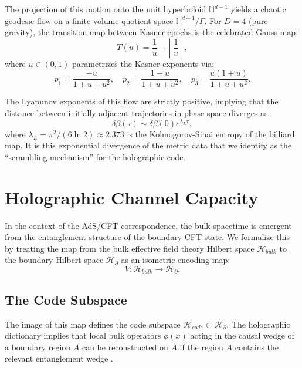 \documentclass[aps,prd,reprint,nofootinbib,amsmath,amssymb,amsfonts]{revtex4-2}
\begin{document}
The projection of this motion onto the unit hyperboloid $\mathbb{H}^{d-1}$ yields a chaotic geodesic flow on a finite volume quotient space $\mathbb{H}^{d-1} / \Gamma$. For $D=4$ (pure gravity), the transition map between Kasner epochs is the celebrated Gauss map:
\begin{equation}
    T(u) = \frac{1}{u} - \left\lfloor \frac{1}{u} \right\rfloor,
    \label{eq:gauss_map}
\end{equation}
where $u \in (0,1)$ parametrizes the Kasner exponents via:
\begin{equation}
    p_1 = \frac{-u}{1+u+u^2}, \quad p_2 = \frac{1+u}{1+u+u^2}, \quad p_3 = \frac{u(1+u)}{1+u+u^2}.
\end{equation}

The Lyapunov exponents of this flow are strictly positive, implying that the distance between initially adjacent trajectories in phase space diverges as:
\begin{equation}
    \delta \beta(\tau) \sim \delta \beta(0) e^{\lambda_L \tau},
\end{equation}
where $\lambda_L = \pi^2/(6\ln 2) \approx 2.373$ is the Kolmogorov-Sinai entropy of the billiard map. It is this exponential divergence of the metric data that we identify as the ``scrambling mechanism'' for the holographic code.

\section{Holographic Channel Capacity}
\label{sec:holo}

In the context of the AdS/CFT correspondence, the bulk spacetime is emergent from the entanglement structure of the boundary CFT state. We formalize this by treating the map from the bulk effective field theory Hilbert space $\mathcal{H}_{bulk}$ to the boundary Hilbert space $\mathcal{H}_{\partial}$ as an isometric encoding map:
\begin{equation}
    V: \mathcal{H}_{bulk} \to \mathcal{H}_{\partial}.
\end{equation}

\subsection{The Code Subspace}

The image of this map defines the code subspace $\mathcal{H}_{code} \subset \mathcal{H}_{\partial}$. The holographic dictionary implies that local bulk operators $\phi(x)$ acting in the causal wedge of a boundary region $A$ can be reconstructed on $A$ if the region $A$ contains the relevant entanglement wedge \cite{Dong2016}.
\end{document}
